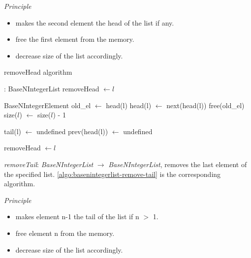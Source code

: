 \documentclass[book, nodocumentinfo]{upmethodology-document}
\begin{document}
\emph{Principle}
\begin{itemize}
    \item makes the second element the head of the list if any.
    \item free the first element from the memory.
    \item decrease size of the list accordingly.
\end{itemize}

\begin{algorithm}[H]
    \label{algo:basenintegerlist-remove-head}
    \caption{removeHead algorithm}

    \begin{algorithmic}
         : BaseNIntegerList
                \State removeHead \(\leftarrow l\)
            \EndIf

            \State BaseNIntegerElement old\_el \(\leftarrow\) head(l)
            \State head(l) \(\leftarrow\) next(head(l))
            \State free(old\_el)
            \State size(\(l\)) \(\leftarrow\) size(\(l\)) - 1

                \State tail(l) \(\leftarrow\) undefined
            \Else
                \State prev(head(l)) \(\leftarrow\) undefined
            \EndIf

            \State removeHead \(\leftarrow l\)
        \EndFunction
    \end{algorithmic}
\end{algorithm}


\emph{removeTail}: \emph{BaseNIntegerList} \(\rightarrow\) \emph{BaseNIntegerList},
removes the last element of the specified list.
\ref{algo:basenintegerlist-remove-tail} is the corresponding algorithm.

\emph{Principle}
\begin{itemize}
    \item makes element n-1 the tail of the list if n \(>\) 1.
    \item free element n from the memory.
    \item decrease size of the list accordingly.
\end{itemize}
\end{document}
